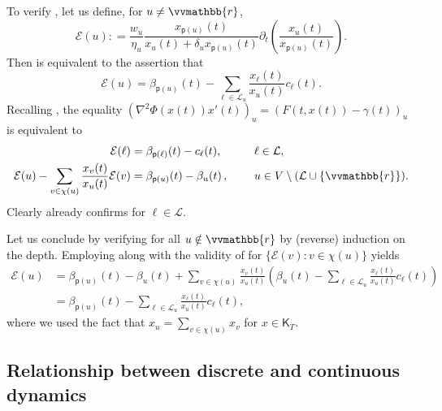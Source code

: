 \documentclass{toc}
\newcommand{\calE}{\mathcal E}
\newcommand{\calL}{\mathcal L}
\newcommand{\vvr}{\vvmathbb{r}}
\newcommand{\seteq}{\mathrel{\mathop:}=}
\newcommand{\sfp}{\mathsf{p}}
\newcommand{\sfK}{\mathsf K}
\begin{document}
To verify , let us define, for $u \neq \vvr$,
\[
\calE(u) \seteq
\frac{w_u}{\eta_u} \frac{x_{\sfp(u)}(t)}{x_u(t)+\delta_u x_{\sfp(u)}(t)} \partial_t \left(\frac{x_u(t)}{x_{\sfp(u)}(t)}\right).
\]
Then  is equivalent to the assertion that
\begin{equation}\label{eq:ass1}
\calE(u) = \beta_{\sfp(u)}(t) - \sum_{\ell \in \calL_u} \frac{x_{\ell}(t)}{x_u(t)} c_{\ell}(t).
\end{equation}
Recalling ,
the equality $\left(\nabla^2 \Phi(x(t)) x'(t)\right)_u = \left(F(t,x(t))-\gamma(t)\right)_u$ is equivalent to
\begin{alignat}{3}
\calE(\ell) &= \beta_{\sfp(\ell)}(t) - c_{\ell}(t), \qquad && \ell \in \calL, \label{eq:eleaves} \\
\calE(u) - \sum_{v \in \chi(u)} \frac{x_v(t)}{x_u(t)} \calE(v) &= \beta_{\sfp(u)}(t) - \beta_u(t)\,, && u \in V \setminus (\calL \cup \{\vvr\}). \label{eq:egen}
\end{alignat}
Clearly  already confirms  for $\ell \in \calL$.


Let us conclude by verifying  for all $u \notin \vvr$  by (reverse) induction on the depth.
Employing  along with the validity of  for $\{\calE(v) : v \in \chi(u)\}$ yields
\begin{align*}
\calE(u) &= \beta_{\sfp(u)}(t) - \beta_u(t) + \sum_{v \in \chi(u)} \frac{x_v(t)}{x_u(t)} \left(\beta_u(t) - \sum_{\ell \in \calL_u} \frac{x_{\ell}(t)}{x_u(t)} c_{\ell}(t)\right) \\
&= \beta_{\sfp(u)}(t) - \sum_{\ell \in \calL_u} \frac{x_{\ell}(t)}{x_{u}(t)} c_{\ell}(t),
\end{align*}
where we used the fact that $x_u = \sum_{v \in \chi(u)} x_v$ for $x \in \sfK_{T}$.

\subsection{Relationship between discrete and continuous dynamics}
\label{sec:continuous}
\end{document}

